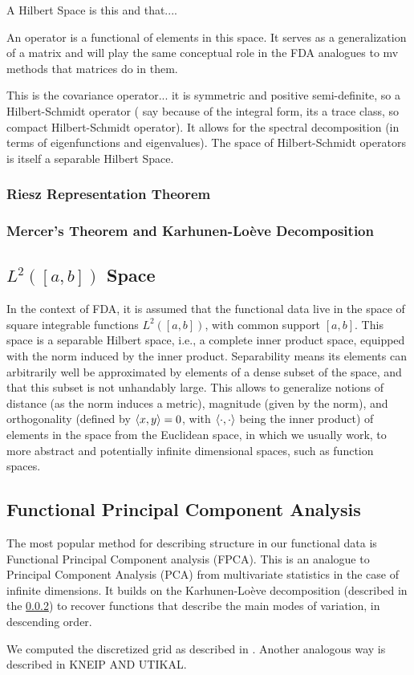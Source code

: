 A Hilbert Space is this and that....

An operator is a functional of elements in this space. It serves as a generalization of
a matrix and will play the same conceptual role in the FDA analogues to mv methods
that matrices do in them.

This is the covariance operator... it is symmetric and positive semi-definite, so
a Hilbert-Schmidt operator (\textcite{WangChiouMüller2016} say because of the integral form,
its a trace class, so compact Hilbert-Schmidt operator). It allows for the spectral
decomposition (in terms of eigenfunctions and eigenvalues). The space of Hilbert-Schmidt
operators is itself a separable Hilbert Space.

\subsubsection{Riesz Representation Theorem}
\label{sec:riesz}

\subsubsection{Mercer's Theorem and Karhunen-Loève Decomposition}
\label{sec:mercer and kh}

\subsection{$L^2([a, b])$ Space}
\label{sec:l2 space}
In the context of FDA, it is assumed that the functional data live in
the space of square integrable functions $L^2([a,b])$, with common
support $[a,b]$. This space is a separable Hilbert space, i.e., a complete inner
product space, equipped with the norm induced by the inner product. Separability means
its elements can arbitrarily well be approximated by elements of a dense subset of the
space, and that this subset is not unhandably large.
This allows to generalize notions of distance (as the norm induces a
metric), magnitude (given by the norm), and orthogonality (defined by
$\left \langle x, y \right \rangle = 0$, with $\left \langle \cdot, \cdot \right \rangle$ being the inner product) of elements
in the space from the Euclidean space, in which we usually work, to more
abstract and potentially infinite dimensional spaces, such as function
spaces.

\subsection{Functional Principal Component Analysis}
\label{sec:fpca}
The most popular method for describing structure in our functional data is Functional
Principal Component analysis (FPCA). This is an analogue to Principal Component Analysis
(PCA) from multivariate statistics in the case of infinite dimensions. It builds on the
Karhunen-Loève decomposition (described in the \ref{sec:mercer and kh}) to recover functions
that describe the main modes of variation, in descending order.

We computed the discretized grid as described in \citet[Chapter~8.4.1]{RamsaySilverman2005}. Another analogous way
is described in KNEIP AND UTIKAL.
